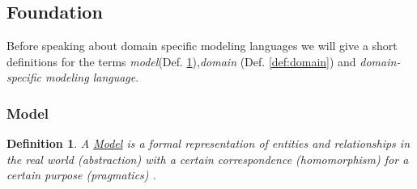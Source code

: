 \documentclass[runningheads,a4paper]{llncs}
\newtheorem{defn}{Definition}
\begin{document}

\subsection{Foundation}
\label{subsec:introduction}
Before speaking about domain specific modeling languages we will give a short definitions for the  
terms \emph{model}(Def. \ref{def:model}),\emph{domain} (Def. \ref{def:domain}) and \emph{domain-specific modeling language}.

\subsubsection{Model}
% 
%  
%  
  \begin{defn}
    \label{def:model}
    A \underline{Model} is a formal representation of entities and relationships in the real world (abstraction) 
    with a certain correspondence (homomorphism) for a certain purpose (pragmatics) \cite{stachowiak1973allgemeine}.
  \end{defn}
  
\end{document}
